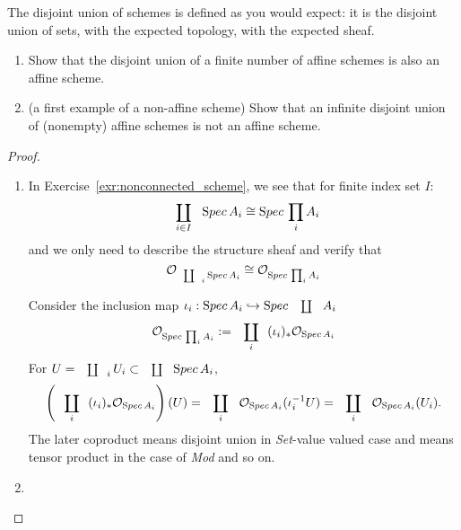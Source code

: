 \documentclass[11pt,fleqn]{book}
\begin{document}
\begin{exr}
The disjoint union of schemes is defined as you would expect: it is the disjoint union of sets, with the expected topology, with the expected sheaf.
\begin{enumerate}[label=(\alph*)]
\item Show that the disjoint union of a finite number of affine schemes is also an affine scheme.
\item (a first example of a non-affine scheme) Show that an infinite disjoint union of (nonempty) affine schemes is not an affine scheme. 
\end{enumerate}
\end{exr}
\begin{proof}
\begin{enumerate}[label=(\alph*)]
\item In Exercise~\ref{exr:nonconnected_scheme}, we see that for finite index set $I$:
$$
\coprod_{i\in I}\spec A_i\cong\spec \prod_i A_i
$$
and we only need to describe the structure sheaf and verify that
$$
\calo_{\coprod_i \spec A_i}\cong \calo_{\spec \prod_i A_i}
$$

 Consider the inclusion map $\iota_i: \spec A_i\inj \spec \coprod A_i$
$$
\calo_{\spec \prod_i A_i}:= \coprod_i (\iota_{i})_*\calo_{\spec A_i}
$$
For $U=\coprod_i U_i\subset \coprod \spec A_i$,
$$
\left(\coprod_i (\iota_{i})_* \calo_{\spec A_i}\right)(U)=\coprod_i \calo_{\spec A_i}(\iota_i^{-1}U)=\coprod_{i}\calo_{\spec A_i}(U_i).
$$ 
The later coproduct means disjoint union in \textit{Set}-value valued case and means tensor product in the case of \textit{Mod} and so on.

\item 
\end{enumerate}
\end{proof}
\end{document}
